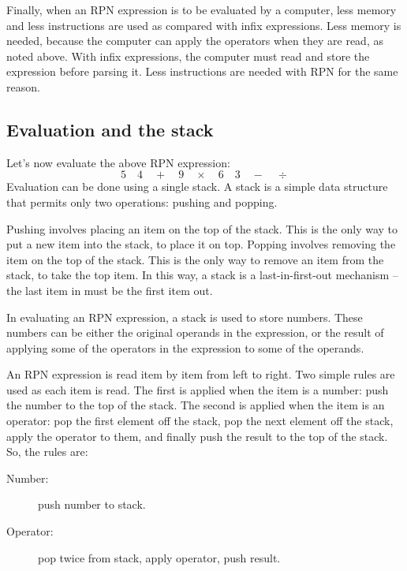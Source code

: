 \documentclass[a4paper]{iagproc}
\begin{document}
Finally, when an RPN expression is to be evaluated by a computer, less memory and less instructions are used as compared with infix expressions.
Less memory is needed, because the computer can apply the operators when they are read, as noted above.
With infix expressions, the computer must read and store the expression before parsing it.
Less instructions are needed with RPN for the same reason.

\subsection*{Evaluation and the stack}
Let's now evaluate the above RPN expression:
$$ 5 \quad 4 \quad + \quad 9 \quad \times \quad  6 \quad 3 \quad - \quad \div $$
Evaluation can be done using a single stack.
A stack is a simple data structure that permits only two operations: pushing and popping.

Pushing involves placing an item on the top of the stack.
This is the only way to put a new item into the stack, to place it on top.
Popping involves removing the item on the top of the stack.
This is the only way to remove an item from the stack, to take the top item.
In this way, a stack is a last-in-first-out mechanism -- the last item in must be the first item out.

In evaluating an RPN expression, a stack is used to store numbers.
These numbers can be either the original operands in the expression, or the result of applying some of the operators in the expression to some of the operands.

An RPN expression is read item by item from left to right.
Two simple rules are used as each item is read.
The first is applied when the item is a number: push the number to the top of the stack.
The second is applied when the item is an operator: pop the first element off the stack, pop the next element off the stack, apply the operator to them, and finally push the result to the top of the stack.
So, the rules are:
\begin{description}
  \item[Number:] push number to stack.
  \item[Operator:] pop twice from stack, apply operator, push result.
\end{description}
\end{document}
